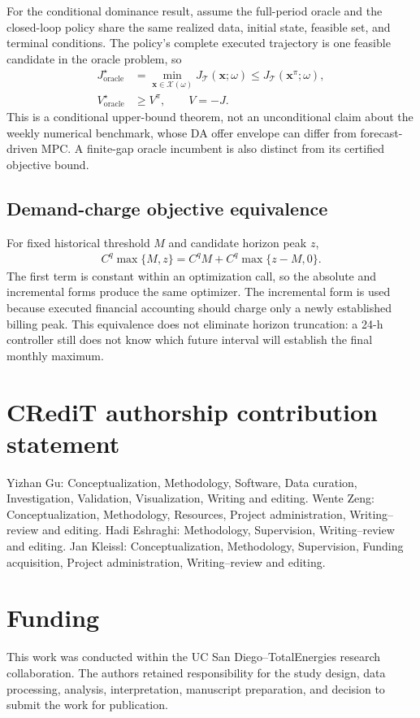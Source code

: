 \documentclass[final,5p,times]{elsarticle}
\newcommand{\calT}{\mathcal{T}}
\begin{document}
For the conditional dominance result, assume the full-period oracle and the
closed-loop policy share the same realized data, initial state, feasible set,
and terminal conditions.
The policy's complete executed trajectory is one feasible candidate in the
oracle problem, so
\begin{align}
J_{\mathrm{oracle}}^\star
&=\min_{\boldsymbol{x}\in\mathcal{X}(\omega)}J_{\calT}(\boldsymbol{x};\omega)
\le J_{\calT}(\boldsymbol{x}^{\pi};\omega), \label{eq:app_oracle_cost_proof}\\
V_{\mathrm{oracle}}^\star&\ge V^\pi,\qquad V=-J. \label{eq:app_oracle_value_proof}
\end{align}
This is a conditional upper-bound theorem, not an unconditional claim about
the weekly numerical benchmark, whose DA offer envelope can differ from
forecast-driven MPC. A finite-gap oracle incumbent is also distinct from its
certified objective bound.

\subsection{Demand-charge objective equivalence}
For fixed historical threshold $M$ and candidate horizon peak $z$,
\begin{align}
C^q\max\{M,z\}
=C^qM+C^q\max\{z-M,0\}. \label{eq:app_demand_equivalence}
\end{align}
The first term is constant within an optimization call, so the absolute and incremental
forms produce the same optimizer. The incremental form is used because executed
financial accounting should charge only a newly established billing peak. This
equivalence does not eliminate horizon truncation: a 24-h controller still does
not know which future interval will establish the final monthly maximum.

\section*{CRediT authorship contribution statement}
Yizhan Gu: Conceptualization, Methodology, Software, Data curation, Investigation, Validation, Visualization, Writing and editing. Wente Zeng: Conceptualization, Methodology, Resources, Project administration, Writing--review and editing. Hadi Eshraghi: Methodology, Supervision, Writing--review and editing. Jan Kleissl: Conceptualization,
Methodology, Supervision, Funding acquisition, Project administration, Writing--review and editing.

\section*{Funding}
This work was conducted within the UC San Diego--TotalEnergies research
collaboration. The authors retained responsibility for the study design, data
processing, analysis, interpretation, manuscript preparation, and decision to
submit the work for publication.
\end{document}
